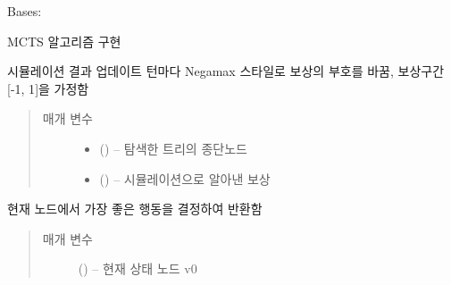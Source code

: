 \documentclass[letterpaper,10pt,english]{sphinxmanual}
\begin{document}
\begin{fulllineitems}
\label{\detokenize{agents.search:agents.search.mcts_agent.MCTSPlanner}}
Bases: 

MCTS 알고리즘 구현

\begin{fulllineitems}
\label{\detokenize{agents.search:agents.search.mcts_agent.MCTSPlanner.backup}}
시뮬레이션 결과 업데이트
턴마다 Negamax 스타일로 보상의 부호를 바꿈, 
보상구간 {[}-1, 1{]}을 가정함
\begin{quote}\begin{description}
\item[{매개 변수}] \leavevmode\begin{itemize}
\item {} 
 () -- 탐색한 트리의 종단노드

\item {} 
 () -- 시뮬레이션으로 알아낸 보상

\end{itemize}

\end{description}\end{quote}

\end{fulllineitems}


\begin{fulllineitems}
\label{\detokenize{agents.search:agents.search.mcts_agent.MCTSPlanner.best_child}}
현재 노드에서 가장 좋은 행동을 결정하여 반환함
\begin{quote}\begin{description}
\item[{매개 변수}] \leavevmode
{} () -- 현재 상태 노드 v0


\end{description}
\end{quote}
\end{fulllineitems}
\end{fulllineitems}
\end{document}
